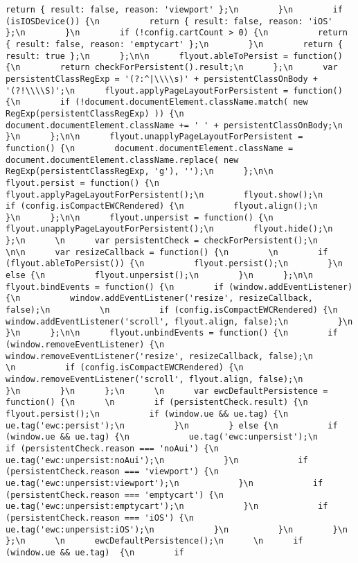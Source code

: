 \documentclass[
]{article}
\begin{document}
\begin{verbatim}
return { result: false, reason: 'viewport' };\n        }\n        if (isIOSDevice()) {\n          return { result: false, reason: 'iOS' };\n        }\n        if (!config.cartCount > 0) {\n          return { result: false, reason: 'emptycart' };\n        }\n        return { result: true };\n      };\n\n      flyout.ableToPersist = function() {\n        return checkForPersistent().result;\n      };\n      var persistentClassRegExp = '(?:^|\\\\s)' + persistentClassOnBody + '(?!\\\\S)';\n      flyout.applyPageLayoutForPersistent = function() {\n        if (!document.documentElement.className.match( new RegExp(persistentClassRegExp) )) {\n          document.documentElement.className += ' ' + persistentClassOnBody;\n        }\n      };\n\n      flyout.unapplyPageLayoutForPersistent = function() {\n        document.documentElement.className = document.documentElement.className.replace( new RegExp(persistentClassRegExp, 'g'), '');\n      };\n\n      flyout.persist = function() {\n        flyout.applyPageLayoutForPersistent();\n        flyout.show();\n        if (config.isCompactEWCRendered) {\n          flyout.align();\n        }\n      };\n\n      flyout.unpersist = function() {\n        flyout.unapplyPageLayoutForPersistent();\n        flyout.hide();\n      };\n      \n      var persistentCheck = checkForPersistent();\n    \n\n      var resizeCallback = function() {\n        \n        if (flyout.ableToPersist()) {\n          flyout.persist();\n        }\n        else {\n          flyout.unpersist();\n        }\n      };\n\n      flyout.bindEvents = function() {\n        if (window.addEventListener) {\n          window.addEventListener('resize', resizeCallback, false);\n          \n          if (config.isCompactEWCRendered) {\n            window.addEventListener('scroll', flyout.align, false);\n          }\n        }\n      };\n\n      flyout.unbindEvents = function() {\n        if (window.removeEventListener) {\n          window.removeEventListener('resize', resizeCallback, false);\n          \n          if (config.isCompactEWCRendered) {\n            window.removeEventListener('scroll', flyout.align, false);\n          }\n        }\n      };\n      \n      var ewcDefaultPersistence = function() {\n      \n        if (persistentCheck.result) {\n          flyout.persist();\n          if (window.ue && ue.tag) {\n            ue.tag('ewc:persist');\n          }\n        } else {\n          if (window.ue && ue.tag) {\n            ue.tag('ewc:unpersist');\n            if (persistentCheck.reason === 'noAui') {\n              ue.tag('ewc:unpersist:noAui');\n            }\n            if (persistentCheck.reason === 'viewport') {\n              ue.tag('ewc:unpersist:viewport');\n            }\n            if (persistentCheck.reason === 'emptycart') {\n              ue.tag('ewc:unpersist:emptycart');\n            }\n            if (persistentCheck.reason === 'iOS') {\n              ue.tag('ewc:unpersist:iOS');\n            }\n          }\n        }\n      };\n      \n      ewcDefaultPersistence();\n      \n      if (window.ue && ue.tag)  {\n        if 
\end{verbatim}
\end{document}
